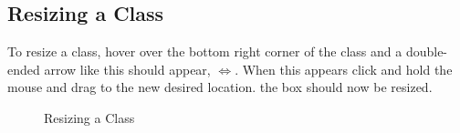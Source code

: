 \documentclass[a4paper]{article}
\begin{document}
\subsection{Resizing a Class}
To resize a class, hover over the bottom right corner of the class and a double-ended arrow like this should appear, $\Leftrightarrow$. When this appears click and hold the mouse and drag to the new desired location. the box should now be resized.
\begin{figure}[H]
\begin{center}
 \imagespace
{}
\caption{Resizing a Class}
\end{center}
\end{figure}
\end{document}
